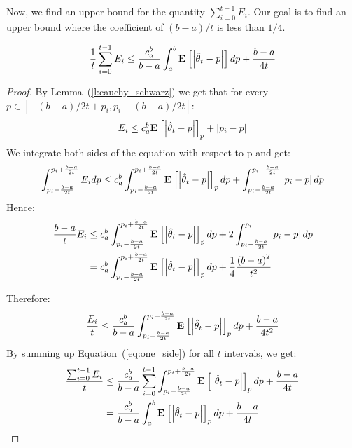 Now, we find an upper bound for the quantity
$\sum_{i=0}^{t-1} E_i$.
Our goal is to find an upper bound where the coefficient of
$(b-a)/t$ is less than $1/4$.

\begin{lemma}\label{l:upper}
  \[
    \frac{1}{t} \sum_{i=0}^{t-1}
    E_i \leq
    \frac{c_a^b}{b-a} \int_a^b \Exp{\lp|\hat{\theta}_t-p\rp|} dp +
    \frac{b-a}{4t}
  \]
\end{lemma}
\begin{proof}
  By Lemma~(\ref{l:cauchy_schwarz}) we get that
  for every $p\in [-(b-a)/{2t} + p_i , p_i + (b-a)/{2t}]$:
  $$E_i \leq  c_a^b\Exp{\lp|\hat{\theta}_t-p\rp|}_p + \lp|p_i - p\rp|$$
  We integrate both sides of the equation with respect to p and get:
  \[
    \int_{p_i - \frac{b-a}{2t}}^{p_i + \frac{b-a}{2t}} E_i dp \leq c_a^b
    \int_{p_i - \frac{b-a}{2t}}^{p_i + \frac{b-a}{2t}}
    \Exp{\lp|\hat{\theta}_t-p\rp|}_p dp +
    \int_{p_i - \frac{b-a}{2t}}^{p_i + \frac{b-a}{2t}}\lp|p_i - p\rp| dp
  \]
  Hence:
  \begin{align*}
    \frac{b-a}{t} E_i
    &\leq
    c_a^b\int_{p_i - \frac{b-a}{2t}}^{p_i+ \frac{b-a}{2t}}
    \Exp{\lp|\hat{\theta}_t-p\rp|}_p dp +
    2\int_{p_i - \frac{b-a}{2t}}^{p_i}\lp|p_i-p\rp|dp\\
    &= c_a^b\int_{p_i - \frac{b-a}{2t}}^{p_i + \frac{b-a}{2t}}
    \Exp{\lp|\hat{\theta}_t-p\rp|}_p
    dp + \frac{1}{4} \frac{\lp(b-a\rp)^2}{t^2}
  \end{align*}

  Therefore:
  \begin{equation}\label{eq:one_side}
    \frac{E_i}{t} \leq \frac{c_a^b}{b-a}
    \int_{p_i - \frac{b-a}{2t}}^{p_i + \frac{b-a}{2t}}
    \Exp{\lp|\hat{\theta}_t-p\rp|}_p dp + \frac{b-a}{4t^2}
  \end{equation}
  By summing up Equation~(\ref{eq:one_side}) for all $t$ intervals, we get:
  \begin{align*}
    \frac{\sum_{i=0}^{t-1} E_i}{t} &\leq \frac{c_a^b}{b-a} \sum_{i=0}^{t-1}
    \int_{p_i - \frac{b-a}{2t}}^{p_i+ \frac{b-a}{2t}}
    \Exp{\lp|\hat{\theta}_t-p\rp|}_p dp + \frac{b-a}{4t}\\
    &=
    \frac{c_a^b}{b-a} \int_a^b \Exp{\lp|\hat{\theta}_t-p\rp|}_p dp + \frac{b-a}{4t}
  \end{align*}
\end{proof}

